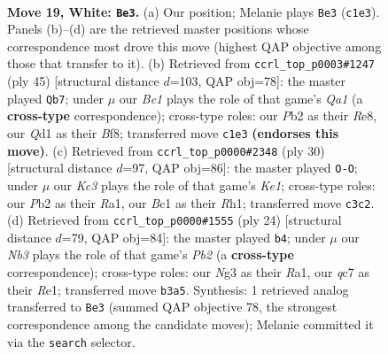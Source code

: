 \documentclass[11pt]{article}
\begin{document}
\clearpage

\begin{figure}[p]\centering
\begin{subfigure}{0.46\textwidth}\centering
\resizebox{\linewidth}{!}{%
\newchessgame
\chessboard[
  setfen={r1b2kr1/1pq1bp1p/p3n1p1/2Ppn3/8/1NK3N1/PP3PPP/1RBQ1B1R w - - 6 19},
  showmover=false,
  pgfstyle=straightmove, color=movearrow, markmove={c1-e3}
]}
\caption{}
\end{subfigure}\hfill
\begin{subfigure}{0.46\textwidth}\centering
\resizebox{\linewidth}{!}{%
\newchessgame
\chessboard[
  setfen={q3rbk1/2pn1p1p/1nb3p1/1p2p3/1P2P3/2PB1N1P/1BQN1PP1/4R1K1 b - - 5 23},
  showmover=false,
  pgfstyle=straightmove, color=movearrow, markmove={a8-b7}
]}
\caption{}
\end{subfigure}
\\[4pt]
\begin{subfigure}{0.46\textwidth}\centering
\resizebox{\linewidth}{!}{%
\newchessgame
\chessboard[
  setfen={r1b2rk1/1pq1np1p/p3pnp1/8/2PN4/2N1Q3/PP2BPPP/R3K2R w KQ - 5 16},
  showmover=false,
  pgfstyle=straightmove, color=movearrow, markmove={e1-g1}
]}
\caption{}
\end{subfigure}\hfill
\begin{subfigure}{0.46\textwidth}\centering
\resizebox{\linewidth}{!}{%
\newchessgame
\chessboard[
  setfen={r1br2k1/ppq1bpp1/2n1pn1p/8/3P4/P1NQ1N2/BP3PPP/R1B1R1K1 w - - 0 13},
  showmover=false,
  pgfstyle=straightmove, color=movearrow, markmove={b2-b4}
]}
\caption{}
\end{subfigure}
\caption{\textbf{Move 19, White: \texttt{Be3}.} (a) Our position; Melanie plays \texttt{Be3} (\texttt{c1e3}). Panels (b)--(d) are the retrieved master positions whose correspondence most drove this move (highest QAP objective among those that transfer to it). (b) Retrieved from \texttt{ccrl\_top\_p0003\#1247} (ply 45) [structural distance $d$=103, QAP obj=78]: the master played \texttt{Qb7}; under $\mu$ our \emph{Bc1} plays the role of that game's \emph{Qa1} (a \textbf{cross-type} correspondence); cross-type roles: our \emph{P}b2 as their \emph{R}e8, our \emph{Q}d1 as their \emph{B}f8; transferred move \texttt{c1e3} \textbf{(endorses this move)}. (c) Retrieved from \texttt{ccrl\_top\_p0000\#2348} (ply 30) [structural distance $d$=97, QAP obj=86]: the master played \texttt{O-O}; under $\mu$ our \emph{Kc3} plays the role of that game's \emph{Ke1}; cross-type roles: our \emph{P}b2 as their \emph{R}a1, our \emph{B}c1 as their \emph{R}h1; transferred move \texttt{c3c2}. (d) Retrieved from \texttt{ccrl\_top\_p0000\#1555} (ply 24) [structural distance $d$=79, QAP obj=84]: the master played \texttt{b4}; under $\mu$ our \emph{Nb3} plays the role of that game's \emph{Pb2} (a \textbf{cross-type} correspondence); cross-type roles: our \emph{N}g3 as their \emph{R}a1, our \emph{q}c7 as their \emph{R}e1; transferred move \texttt{b3a5}. Synthesis: 1 retrieved analog transferred to \texttt{Be3} (summed QAP objective 78, the strongest correspondence among the candidate moves); Melanie committed it via the \texttt{search} selector.}
\label{fig:thought-m36}
\end{figure}
\end{document}

